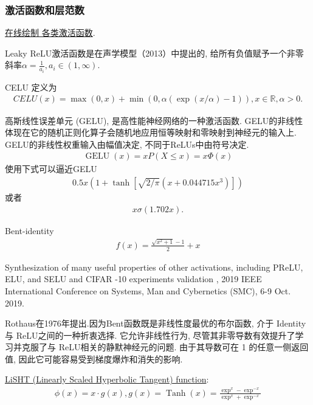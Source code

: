 \subsubsection{激活函数和层范数}
\href{https://dashee87.github.io/deep\%20learning/visualising-activation-functions-in-neural-networks/}{在线绘制 各类激活函数}.
\begin{remark}
Leaky ReLU激活函数是在声学模型（2013）中提出的, 给所有负值赋予一个非零斜率$\alpha=\frac 1 {a_i}, a_i\in (1,\infty)$.
\end{remark}
\begin{remark}
CELU \cite{hendrycks2016gelu} 定义为
\begin{align}
 CELU(x)=\max(0,x)+\min(0,\alpha(\exp(x/\alpha)-1)), x\in \mathbb R, \alpha> 0.
\end{align}
\end{remark}
\begin{remark}
高斯线性误差单元 (GELU), 是高性能神经网络的一种激活函数. GELU的非线性体现在它的随机正则化算子会随机地应用恒等映射和零映射到神经元的输入上.
GELU的非线性权重输入由幅值决定, 不同于ReLUs中由符号决定.
\begin{align}
  \operatorname{GELU}(x)=x P(X \leq x)=x \Phi(x)
\end{align}
使用下式可以逼近GELU
\begin{align}
  0.5 x\left(1+\tanh \left[\sqrt{2 / \pi}\left(x+0.044715 x^{3}\right)\right]\right)
\end{align}
或者
\begin{align}
  x \sigma(1.702 x).
\end{align}
\end{remark}

Bent-identity
\begin{align}
  f(x) = \frac{\sqrt{x^2 + 1} - 1}{2} +x
\end{align}

Synthesization of many useful properties of other activations, including PReLU, ELU, and SELU and CIFAR -10 experiments  validation \cite{Godfrey2019-9846}, 2019 IEEE International Conference on Systems, Man and Cybernetics (SMC), 6-9 Oct. 2019.

Rothaus在1976年提出.因为Bent函数既是非线性度最优的布尔函数, 介于 Identity 与 ReLU之间的一种折衷选择. 它允许非线性行为, 尽管其非零导数有效提升了学习并克服了与 ReLU相关的静默神经元的问题.
由于其导数可在 1 的任意一侧返回值, 因此它可能容易受到梯度爆炸和消失的影响.

\href{https://arxiv.org/pdf/1901.05894.pdf}{LiSHT (Linearly Scaled Hyperbolic Tangent) function}:
\begin{align}
  \phi(x)=x \cdot g(x), g(x)=\operatorname{Tanh}(x)=\frac{\exp ^{x}-\exp ^{-x}}{\exp ^{x}+\exp ^{-x}}
\end{align}

